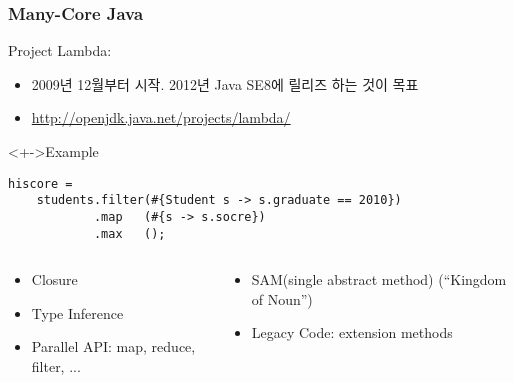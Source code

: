 \begin{frame}[fragile]
\frametitle{Many-Core Java}

Project Lambda: 
\begin{itemize}
\item 2009년 12월부터 시작. 2012년 Java SE8에 릴리즈 하는 것이 목표
\item \url{http://openjdk.java.net/projects/lambda/}
\end{itemize}

\lstset{language=Java,basicstyle=\ttfamily\small}
\begin{block}<+->{Example}
\begin{lstlisting}
hiscore = 
    students.filter(#{Student s -> s.graduate == 2010})
            .map   (#{s -> s.socre}) 
            .max   ();
\end{lstlisting}
\end{block}

\begin{columns}[t]
    \begin{column}{0.5\textwidth}
        \begin{itemize}
        \item Closure
        \item Type Inference
        \item Parallel API: map, reduce, filter, ...
        \end{itemize}
    \end{column}

    \begin{column}{0.5\textwidth}
        \begin{itemize}
        \item SAM(single abstract method) (``Kingdom of Noun'')
        \item Legacy Code: extension methods
        \end{itemize}
    \end{column}
\end{columns}


\end{frame}
